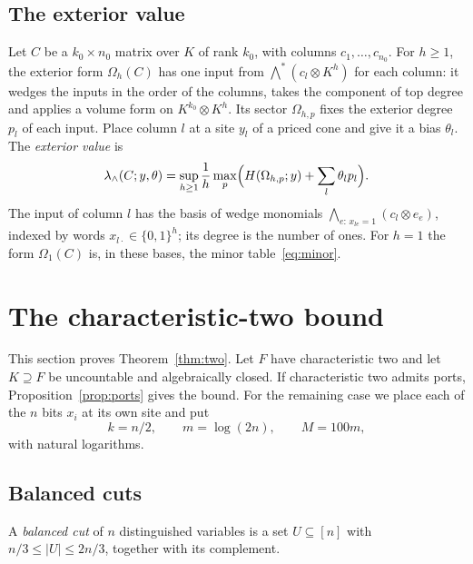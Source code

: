 \documentclass[11pt]{article}
\theoremstyle{remark}
\newcommand{\lamext}{\lambda_\wedge}
\begin{document}
\subsection{The exterior value}
Let \(C\) be a \(k_0\times n_0\) matrix over \(K\) of rank \(k_0\), with
columns \(c_1,\ldots,c_{n_0}\). For \(h\ge1\), the exterior form
\(\Omega_h(C)\) has one input from
\(\bigwedge^*(c_l\otimes K^h)\) for each column: it wedges the inputs in
the order of the columns, takes the component of top degree and applies a
volume form on \(K^{k_0}\otimes K^h\). Its sector \(\Omega_{h,p}\) fixes
the exterior degree \(p_l\) of each input. Place column \(l\) at a site
\(y_l\) of a priced cone and give it a bias \(\theta_l\). The
\emph{exterior value} \cite[Equation (8.1)]{hc} is
\[
 \lamext(C;y,\theta)=\sup_{h\ge1}\frac1h\max_p
   \Bigl(H(\Omega_{h,p};y)+\sum_l\theta_lp_l\Bigr).
\]
The input of column \(l\) has the basis of wedge monomials
\(\bigwedge_{e:\,x_{le}=1}(c_l\otimes e_e)\), indexed by words
\(x_{l\cdot}\in\{0,1\}^h\); its degree is the number of ones. For
\(h=1\) the form \(\Omega_1(C)\) is, in these bases, the minor
table~\eqref{eq:minor}.

\section{The characteristic-two bound}\label{sec:two}
This section proves Theorem~\ref{thm:two}. Let \(F\) have characteristic
two and let \(K\supseteq F\) be uncountable and algebraically closed. If
characteristic two admits ports, Proposition~\ref{prop:ports} gives the
bound. For the remaining case we place each of the \(n\) bits \(x_i\)
at its own site and put
\[
 k=n/2,\qquad m=\log(2n),\qquad M=100m,
\]
with natural logarithms.

\subsection{Balanced cuts}
A \emph{balanced cut} of \(n\) distinguished variables is a set
\(U\subseteq[n]\) with \(n/3\le|U|\le2n/3\), together with its complement.
\end{document}
